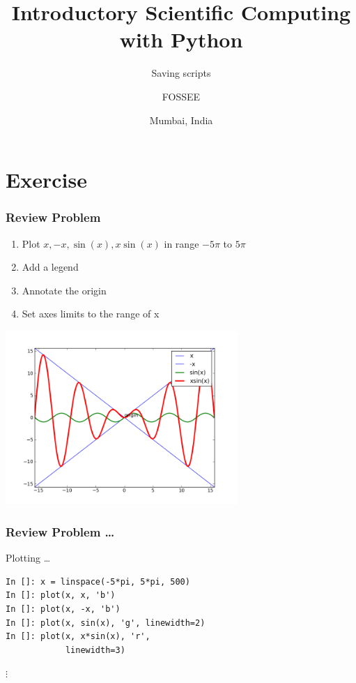 \documentclass[14pt,compress]{beamer}
\title[Saving scripts]{Introductory Scientific Computing with
Python}
\subtitle{Saving scripts}
\author[FOSSEE] {FOSSEE}
\institute[IIT Bombay] {Department of Aerospace Engineering\\IIT Bombay}
\date[] {Mumbai, India
}
\begin{document}
\begin{frame}
  \maketitle
\end{frame}


\section{Exercise}

\begin{frame}
\frametitle{Review Problem}
\begin{enumerate}
\item Plot $x, -x, \sin(x), x \sin(x)$ in range $-5\pi$ to $5\pi$
\item Add a legend
\item Annotate the origin
\item Set axes limits to the range of x
\end{enumerate}
\vspace*{-0.15in}
\begin{center}
  \includegraphics[height=2.6in, interpolate=true]{data/four_plot}
\end{center}
\end{frame}

\begin{frame}[fragile]
\frametitle{Review Problem \ldots}
\alert{Plotting \ldots}
\begin{lstlisting}
In []: x = linspace(-5*pi, 5*pi, 500)
In []: plot(x, x, 'b')
In []: plot(x, -x, 'b')
In []: plot(x, sin(x), 'g', linewidth=2)
In []: plot(x, x*sin(x), 'r',
            linewidth=3)
\end{lstlisting}
$\vdots$
\end{frame}
\end{document}

